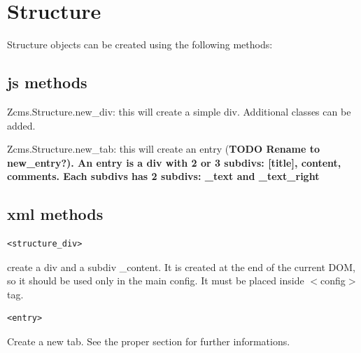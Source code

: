 \documentclass[a4paper,12pt]{article}
\begin{document}
\section{Structure}
Structure objects can be created using the following methods:
\subsection{js methods}
\begin{list}{-}{}
 \item Zcms.Structure.new\_div: this will create a simple div. Additional classes can be added.
\item Zcms.Structure.new\_tab: this will create an entry (\bfseries{TODO} \normalfont Rename to new\_entry?). An entry is a div with 2 or 3 subdivs: [title], content, comments. Each subdivs has 2 subdivs: \_text and \_text\_right
\end{list}
\subsection{xml methods}
\begin{list}{-}{}
  \item \begin{verbatim}
<structure_div>         
        \end{verbatim}
create a div and a subdiv \_content. It is created at the end of the current DOM, so it should be used only in the main config. It must be placed inside $<$config$>$ tag.
\item \begin{verbatim}
<entry>       
      \end{verbatim}
Create a new tab. See the proper section for further informations.
\end{list}
\end{document}
